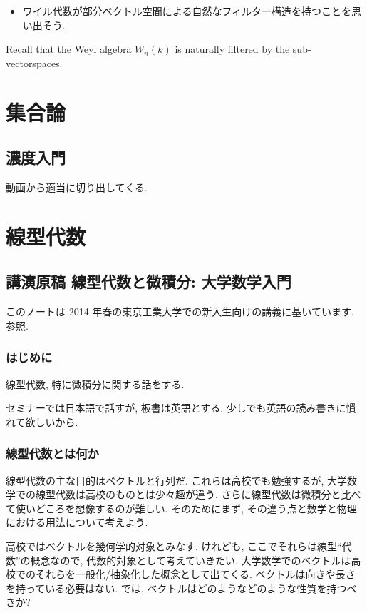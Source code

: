 \documentclass[openany, a4paper, oneside]{jsbook}
\begin{document}
\begin{itemize}
\item ワイル代数が部分ベクトル空間による自然なフィルター構造を持つことを思い出そう.
\end{itemize}
Recall that the Weyl algebra $W_n(k)$ is naturally filtered by the sub-vectorspaces.

\onecolumn
\part{集合論}

\chapter{濃度入門}

動画から適当に切り出してくる.
\part{線型代数}

\chapter{講演原稿 線型代数と微積分: 大学数学入門}

このノートは 2014 年春の東京工業大学での新入生向けの講義に基いています.
\cite{MasahikoSaitoh1, AsaoArai3, AraiEzawa1, AraiEzawa2, KenjiFukaya2, ToshioNiwa1} 参照.
\section{はじめに}

線型代数, 特に微積分に関する話をする.

セミナーでは日本語で話すが, 板書は英語とする.
少しでも英語の読み書きに慣れて欲しいから.
\section{線型代数とは何か}

線型代数の主な目的はベクトルと行列だ.
これらは高校でも勉強するが,
大学数学での線型代数は高校のものとは少々趣が違う.
さらに線型代数は微積分と比べて使いどころを想像するのが難しい.
そのためにまず, その違う点と数学と物理における用法について考えよう.

高校ではベクトルを幾何学的対象とみなす.
けれども, ここでそれらは線型``代数''の概念なので,
代数的対象として考えていきたい.
大学数学でのベクトルは高校でのそれらを一般化/抽象化した概念として出てくる.
ベクトルは向きや長さを持っている必要はない.
では, ベクトルはどのようなどのような性質を持つべきか?
\end{document}
